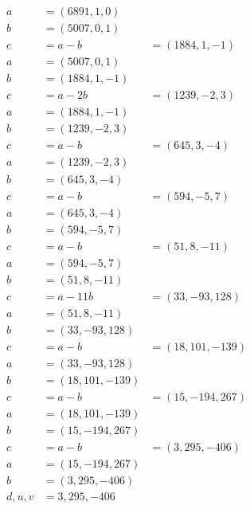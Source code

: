 \documentclass{article}
\begin{document}
\section{}
\begin{equation}
\begin{aligned}
a &= (6891,1,0) \\
b &= (5007,0,1) \\
c &= a-b &= (1884,1,-1) \\
a &= (5007,0,1) \\
b &= (1884,1,-1) \\
c &= a-2b &= (1239,-2,3) \\
a &= (1884,1,-1) \\
b &= (1239,-2,3) \\
c &= a-b &= (645,3,-4) \\
a &= (1239,-2,3) \\
b &= (645,3,-4) \\
c &= a-b &= (594,-5,7) \\
a &= (645,3,-4) \\
b &= (594,-5,7) \\
c &= a-b &= (51,8,-11) \\
a &= (594,-5,7) \\
b &= (51,8,-11) \\
c &= a-11b &= (33,-93,128) \\
a &= (51,8,-11) \\
b &= (33,-93,128) \\
c &= a-b &= (18,101,-139) \\
a &= (33,-93,128) \\
b &= (18,101,-139) \\
c &= a-b &= (15,-194,267) \\
a &= (18,101,-139) \\
b &= (15,-194,267) \\
c &= a-b &= (3,295,-406) \\
a &= (15,-194,267) \\
b &= (3,295,-406) \\
d,u,v&=3,295,-406
\end{aligned}
\end{equation}
\end{document}
